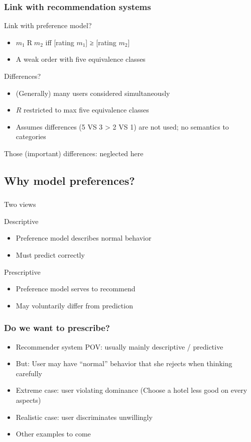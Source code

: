 \documentclass[french,english]{beamer}
\begin{document}
\begin{frame}
	\frametitle{Link with recommendation systems}
	Link with preference model?
	\begin{itemize}
		\item $m_1 \mathrel{R} m_2$ iff [rating $m_1$] ≥ [rating $m_2$]
		\item A weak order with five equivalence classes
	\end{itemize}
	Differences?
	\begin{itemize}
		\item (Generally) many users considered simultaneously
		\item $R$ restricted to max five equivalence classes
		\item Assumes differences (5 VS 3 > 2 VS 1) are not used; no semantics to categories
	\end{itemize}
	Those (important) differences: neglected here
\end{frame}

\subsection{Why model preferences?}
\begin{frame}
	\frametitle{\subsecname}
	Two views
	\begin{block}{Descriptive}
		\begin{itemize}
			\item Preference model describes normal behavior
			\item Must predict correctly
		\end{itemize}
	\end{block}
	\begin{block}{Prescriptive}
		\begin{itemize}
			\item Preference model serves to recommend
			\item May voluntarily differ from prediction
		\end{itemize}
	\end{block}
\end{frame}

\begin{frame}
	\frametitle{Do we want to prescribe?}
	\begin{itemize}
		\item Recommender system POV: usually mainly descriptive / predictive
		\item But: User may have “normal” behavior that she rejects when thinking carefully
		\item Extreme case: user violating dominance (Choose a hotel less good on every aspects)
		\item Realistic case: user discriminates unwillingly
		\item Other examples to come
	\end{itemize}
\end{frame}
\end{document}
